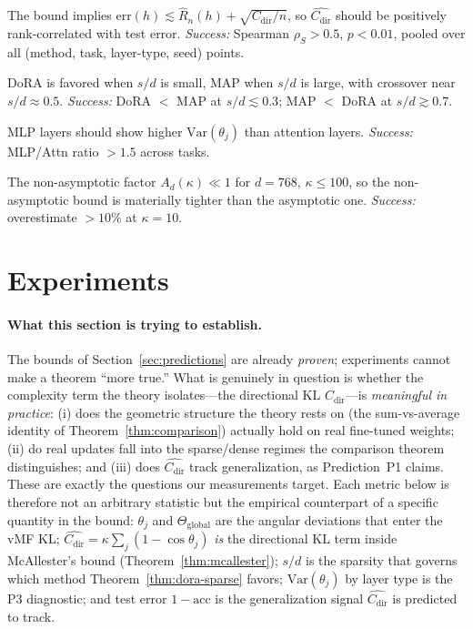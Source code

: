 \documentclass[11pt]{article}
\newcommand{\Cdir}{C_{\mathrm{dir}}}
\newcommand{\Thetaglob}{\Theta_{\mathrm{global}}}
\begin{document}
\begin{description}[leftmargin=*]
\item[(P1) $\widehat{\Cdir}$ predicts test error.] The bound implies
$\mathrm{err}(h)\lesssim\hat R_n(h)+\sqrt{\Cdir/n}$, so $\widehat{\Cdir}$ should be
positively rank-correlated with test error. \emph{Success:} Spearman $\rho_S>0.5$,
$p<0.01$, pooled over all (method, task, layer-type, seed) points.
\item[(P2) Sparse vs.\ dense crossover.] DoRA is favored when $s/d$ is small, MAP
when $s/d$ is large, with crossover near $s/d\approx0.5$. \emph{Success:} DoRA $<$ MAP
at $s/d\lesssim0.3$; MAP $<$ DoRA at $s/d\gtrsim0.7$.
\item[(P3) MLP vs.\ attention angular variance.] MLP layers should show higher
$\mathrm{Var}(\theta_j)$ than attention layers. \emph{Success:} MLP/Attn ratio $>1.5$
across tasks.
\item[(P4) Non-asymptotic bound tighter.] The non-asymptotic factor $A_d(\kappa)\ll1$
for $d=768$, $\kappa\le100$, so the non-asymptotic bound is materially tighter than
the asymptotic one. \emph{Success:} overestimate $>10\%$ at $\kappa=10$.
\end{description}

\section{Experiments}\label{sec:experiments}

\paragraph{What this section is trying to establish.} The bounds of
Section~\ref{sec:predictions} are already \emph{proven}; experiments cannot make a
theorem ``more true.'' What is genuinely in question is whether the complexity term
the theory isolates---the directional KL $\Cdir$---is \emph{meaningful in practice}:
(i) does the geometric structure the theory rests on (the sum-vs-average identity of
Theorem~\ref{thm:comparison}) actually hold on real fine-tuned weights; (ii) do real
updates fall into the sparse/dense regimes the comparison theorem distinguishes; and
(iii) does $\widehat{\Cdir}$ track generalization, as Prediction~P1 claims. These are
exactly the questions our measurements target. Each metric below is therefore not an
arbitrary statistic but the empirical counterpart of a specific quantity in the
bound: $\theta_j$ and $\Thetaglob$ are the angular deviations that enter the vMF KL;
$\widehat{\Cdir}=\kappa\sum_j(1-\cos\theta_j)$ \emph{is} the directional KL term
inside McAllester's bound (Theorem~\ref{thm:mcallester}); $s/d$ is the sparsity that
governs which method Theorem~\ref{thm:dora-sparse} favors; $\mathrm{Var}(\theta_j)$
by layer type is the P3 diagnostic; and test error $1-\mathrm{acc}$ is the
generalization signal $\widehat{\Cdir}$ is predicted to track.
\end{document}
